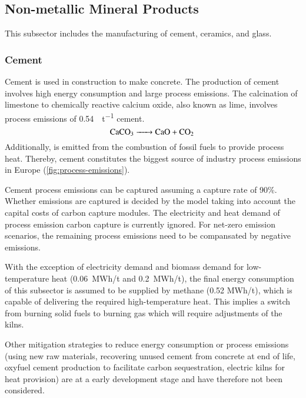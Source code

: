 \subsection{Non-metallic Mineral Products}
\label{sec:si:industry:nmmp}

This subsector includes the manufacturing of cement, ceramics, and glass.

\subsubsection*{Cement}

Cement is used in construction to make concrete. The production of cement
involves high energy consumption and large process emissions. The calcination of
limestone to chemically reactive calcium oxide, also known as lime, involves
process emissions of \SI{0.54}{\tco\per\tonne} cement.
\begin{equation}
    \ce{CaCO3 -> CaO + \co}
\end{equation}
Additionally, \co is emitted from the combustion of fossil fuels to provide
process heat. Thereby, cement constitutes the biggest source of industry
process emissions in Europe (\cref{fig:process-emissions}).

Cement process emissions can be captured assuming a capture rate of 90\%.
 Whether emissions are captured is decided by the model taking
into account the capital costs of carbon capture modules. The electricity and
heat demand of process emission carbon capture is currently ignored. For
net-zero emission scenarios, the remaining process emissions need to be
compansated by negative emissions.

With the exception of electricity demand and biomass demand for low-temperature
heat (0.06~MWh/t and 0.2~MWh/t), the final energy consumption of this subsector is assumed to be supplied
by methane (0.52 MWh/t), which is capable of delivering the required high-temperature heat.
This implies a switch from burning solid fuels to burning gas which will require
adjustments of the kilns.

Other mitigation strategies to reduce energy consumption or process emissions
(using new raw materials, recovering unused cement from concrete at end of life,
oxyfuel cement production to facilitate carbon
sequestration, electric kilns for heat
provision) are at a early development stage and have therefore not been
considered.

